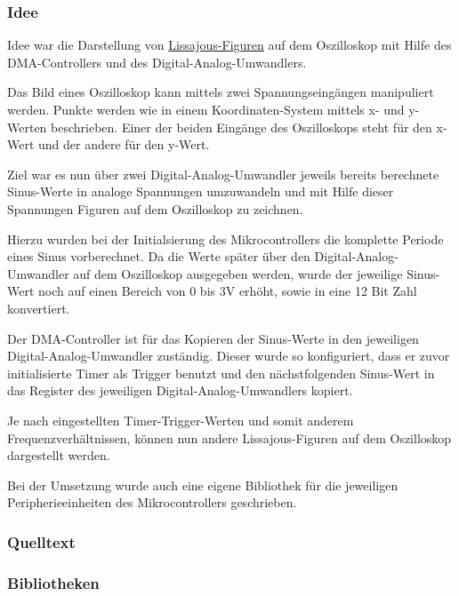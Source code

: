 \subsubsection*{Idee}

Idee war die Darstellung von \href{https://secure.wikimedia.org/wikipedia/de/wiki/Lissajous-Figuren}
{Lissajous-Figuren} auf dem Oszilloskop mit Hilfe des DMA-Controllers und  des Digital-Analog-Umwandlers.

Das Bild eines Oszilloskop kann mittels zwei Spannungseingängen manipuliert werden.
Punkte werden wie in einem Koordinaten-System mittels x- und y-Werten beschrieben.
Einer der beiden Eingänge des Oszilloskops steht für den x-Wert und der andere für den y-Wert.

Ziel war es nun über zwei Digital-Analog-Umwandler jeweils bereits berechnete Sinus-Werte in analoge Spannungen umzuwandeln und mit Hilfe dieser Spannungen Figuren auf dem Oszilloskop zu zeichnen. 

Hierzu wurden bei der Initialsierung des Mikrocontrollers die komplette Periode eines Sinus vorberechnet.
Da die Werte später über den Digital-Analog-Umwandler auf dem Oszilloskop ausgegeben werden,
wurde der jeweilige Sinus-Wert noch auf einen Bereich von 0 bis 3V erhöht, sowie in eine 12 Bit Zahl konvertiert.

Der DMA-Controller ist für das Kopieren der Sinus-Werte in den jeweiligen Digital-Analog-Umwandler zuständig.
Dieser wurde so konfiguriert, dass er zuvor initialisierte Timer als Trigger benutzt und den nächstfolgenden Sinus-Wert in das Register des jeweiligen Digital-Analog-Umwandlers kopiert.

Je nach eingestellten Timer-Trigger-Werten und somit anderem Frequenzverhältnissen, können nun andere Lissajous-Figuren auf dem Oszilloskop dargestellt werden.

Bei der Umsetzung wurde auch eine eigene Bibliothek für die jeweiligen Peripherieeinheiten des Mikrocontrollers geschrieben.

\subsubsection*{Quelltext}





\subsubsection*{Bibliotheken}







